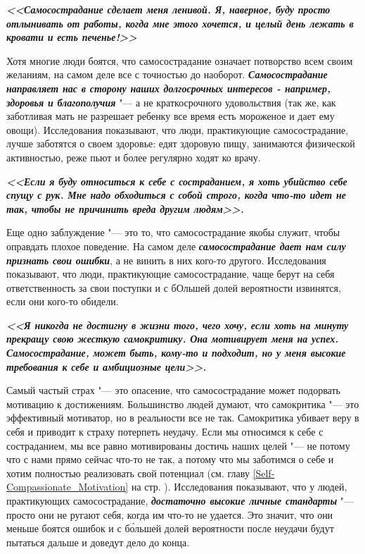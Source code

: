 \vspace{4ex}

\textbf{\textit{<<Самосострадание сделает меня ленивой. Я, наверное, буду просто отлынивать от работы, когда мне этого хочется, и целый день лежать в кровати и есть печенье!>>}}

\vspace{2ex}

Хотя многие люди боятся, что самосострадание означает потворство всем своим желаниям, на самом деле все с точностью до наоборот. \textbf{\textit{Самосострадание направляет нас в сторону наших долгосрочных интересов - например, здоровья и благополучия}} "--- а не краткосрочного удовольствия (так же, как заботливая мать не разрешает ребенку все время есть мороженое и дает ему овощи).  Исследования показывают, что люди, практикующие самосострадание, лучше заботятся о своем здоровье: едят здоровую пищу, занимаются физической активностью, реже пьют и более регулярно ходят ко врачу. 

\vspace{4ex}

\textbf{\textit{<<Если я буду относиться к себе с состраданием, я хоть убийство себе спущу с рук. Мне надо обходиться с собой строго, когда что-то идет не так, чтобы не причинить вреда другим людям>>.}}

\vspace{2ex}

Еще одно заблуждение "--- это то, что самосострадание якобы служит, чтобы оправдать плохое поведение. На самом деле \textbf{\textit{самосострадание дает нам силу признать свои ошибки}}, а не винить в них кого-то другого. Исследования показывают, что люди, практикующие самосострадание, чаще берут на себя ответственность за свои поступки и с бОльшей долей вероятности извинятся, если они кого-то обидели. 

\vspace{4ex}
\textbf{\textit{
<<Я никогда не достигну в жизни того, чего хочу, если хоть на минуту прекращу свою жесткую самокритику. Она мотивирует меня на успех. Самосострадание, может быть, кому-то и подходит, но у меня высокие требования к себе и амбициозные цели>>.}}

\vspace{2ex}
 
Самый частый страх "--- это опасение, что самосострадание может подорвать мотивацию к достижениям. Большинство людей думают, что самокритика "--- это эффективный мотиватор, но в реальности все не так. Самокритика убивает веру в себя и приводит к страху потерпеть неудачу. Если мы относимся к себе с состраданием, мы все равно мотивированы достичь наших целей "--- не потому что с нами прямо сейчас что-то не так, а потому что мы заботимся о себе и хотим полностью реализовать свой потенциал (см. главу \ref{Self-Compassionate_Motivation} на стр. \pageref{Self-Compassionate_Motivation}). Исследования показывают, что у людей, практикующих самосострадание, \textbf{\textit{достаточно высокие личные стандарты}} "--- просто они не ругают себя, когда им что-то не удается. Это значит, что они меньше боятся ошибок и с б\'{о}льшей долей вероятности после неудачи будут пытаться дальше и доведут дело до конца. 


